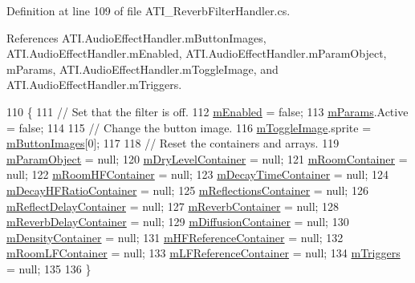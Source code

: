 Definition at line 109 of file A\+T\+I\+\_\+\+Reverb\+Filter\+Handler.\+cs.



References A\+T\+I.\+Audio\+Effect\+Handler.\+m\+Button\+Images, A\+T\+I.\+Audio\+Effect\+Handler.\+m\+Enabled, A\+T\+I.\+Audio\+Effect\+Handler.\+m\+Param\+Object, m\+Params, A\+T\+I.\+Audio\+Effect\+Handler.\+m\+Toggle\+Image, and A\+T\+I.\+Audio\+Effect\+Handler.\+m\+Triggers.


\begin{DoxyCode}
110     \{
111         \textcolor{comment}{// Set that the filter is off.}
112         \hyperlink{class_a_t_i_1_1_audio_effect_handler_a378c463b827ad6e41d09a4ec2caff351}{mEnabled} = \textcolor{keyword}{false};
113         \hyperlink{class_a_t_i___reverb_filter_handler_a034260fbce2052b42bceddc891632347}{mParams}.Active = \textcolor{keyword}{false};
114 
115         \textcolor{comment}{// Change the button image.}
116         \hyperlink{class_a_t_i_1_1_audio_effect_handler_aa5bf03976a14594f089aac5681c15a83}{mToggleImage}.sprite = \hyperlink{class_a_t_i_1_1_audio_effect_handler_a6e1cfd5449b82870eacd7404a158c7a7}{mButtonImages}[0];
117 
118         \textcolor{comment}{// Reset the containers and arrays.}
119         \hyperlink{class_a_t_i_1_1_audio_effect_handler_a02ca13686cb3fc7bf152051ec881b0ed}{mParamObject} = null;
120         \hyperlink{class_a_t_i___reverb_filter_handler_a1373be0e7de8911f4e95f10289117389}{mDryLevelContainer} = null;
121         \hyperlink{class_a_t_i___reverb_filter_handler_aba031a396792257ab91bd8fc56a3c402}{mRoomContainer} = null;
122         \hyperlink{class_a_t_i___reverb_filter_handler_a87b996d08d23419b6403347ca0316daf}{mRoomHFContainer} = null;
123         \hyperlink{class_a_t_i___reverb_filter_handler_a797cdcbb421ba074802a553047cce07e}{mDecayTimeContainer} = null;
124         \hyperlink{class_a_t_i___reverb_filter_handler_a747b42c6663dae5892048cc714677101}{mDecayHFRatioContainer} = null;
125         \hyperlink{class_a_t_i___reverb_filter_handler_a03319a2f6cc8e26f074789fb525584e7}{mReflectionsContainer} = null;
126         \hyperlink{class_a_t_i___reverb_filter_handler_a8344d44e118de9b321cdf0b84a383f89}{mReflectDelayContainer} = null;
127         \hyperlink{class_a_t_i___reverb_filter_handler_a8af547f0f1c566b57439d4ec5ce244b4}{mReverbContainer} = null;
128         \hyperlink{class_a_t_i___reverb_filter_handler_affa45d12ae5c3f25f8662fca54dc6bbe}{mReverbDelayContainer} = null;
129         \hyperlink{class_a_t_i___reverb_filter_handler_a68deedceca43c3fc45ee80912e4c8fa7}{mDiffusionContainer} = null;
130         \hyperlink{class_a_t_i___reverb_filter_handler_a1668ae518533eee4658e3bc65e377491}{mDensityContainer} = null;
131         \hyperlink{class_a_t_i___reverb_filter_handler_a45c18f64f4e32e59580246305ba785ae}{mHFReferenceContainer} = null;
132         \hyperlink{class_a_t_i___reverb_filter_handler_ab29f45ffbe20f9f44305f3f009c8fa6b}{mRoomLFContainer} = null;
133         \hyperlink{class_a_t_i___reverb_filter_handler_ae9010ffdcbb124b62027df7d31feeecb}{mLFReferenceContainer} = null;
134         \hyperlink{class_a_t_i_1_1_audio_effect_handler_a1db04dc85daf07d045117d9bc585e944}{mTriggers} = null;
135 
136     \}
\end{DoxyCode}
